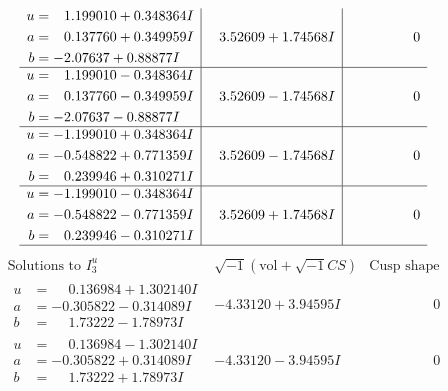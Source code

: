 \documentclass[1p]{elsarticle_modified}
\theoremstyle{definition}
\newcommand{\I}{\sqrt{-1}}
\begin{document}
$$\begin{array}{c|c|c}
\begin{aligned}
u &= \phantom{-}1.199010 + 0.348364 I \\
a &= \phantom{-}0.137760 + 0.349959 I \\
b &= -2.07637 + 0.88877 I\end{aligned}
 & \phantom{-}3.52609 + 1.74568 I & \phantom{-0.000000 } 0 \\ \hline\begin{aligned}
u &= \phantom{-}1.199010 - 0.348364 I \\
a &= \phantom{-}0.137760 - 0.349959 I \\
b &= -2.07637 - 0.88877 I\end{aligned}
 & \phantom{-}3.52609 - 1.74568 I & \phantom{-0.000000 } 0 \\ \hline\begin{aligned}
u &= -1.199010 + 0.348364 I \\
a &= -0.548822 + 0.771359 I \\
b &= \phantom{-}0.239946 + 0.310271 I\end{aligned}
 & \phantom{-}3.52609 - 1.74568 I & \phantom{-0.000000 } 0 \\ \hline\begin{aligned}
u &= -1.199010 - 0.348364 I \\
a &= -0.548822 - 0.771359 I \\
b &= \phantom{-}0.239946 - 0.310271 I\end{aligned}
 & \phantom{-}3.52609 + 1.74568 I & \phantom{-0.000000 } 0\\
 \hline 
 \end{array}$$\newpage$$\begin{array}{c|c|c}  
\text{Solutions to }I^u_{3}& \I (\text{vol} + \sqrt{-1}CS) & \text{Cusp shape}\\
 \hline 
\begin{aligned}
u &= \phantom{-}0.136984 + 1.302140 I \\
a &= -0.305822 - 0.314089 I \\
b &= \phantom{-}1.73222 - 1.78973 I\end{aligned}
 & -4.33120 + 3.94595 I & \phantom{-0.000000 } 0 \\ \hline\begin{aligned}
u &= \phantom{-}0.136984 - 1.302140 I \\
a &= -0.305822 + 0.314089 I \\
b &= \phantom{-}1.73222 + 1.78973 I\end{aligned}
 & -4.33120 - 3.94595 I & \phantom{-0.000000 } 0 \\ \hline\begin{aligned}

\end{aligned}
\end{array}$$
\end{document}
